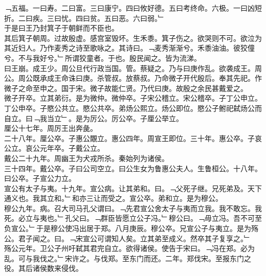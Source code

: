\documentclass{zhvt-classic}
\begin{document}
\hspace*{2em}﹁五福。一曰寿。二曰富。三曰康宁。四曰攸好德。五曰考终命。六极。一曰凶短折。二曰疾。三曰忧。四曰贫。五曰恶。六曰弱。﹂\\
\hspace*{2em}于是曰王乃封箕子于朝鲜而不臣也。\\
\hspace*{2em}其后箕子朝周。过故殷虚。感宫室毁坏。生禾黍。箕子伤之。欲哭则不可。欲泣为其近妇人。乃作麦秀之诗至歌咏之。其诗曰。﹁麦秀渐渐兮。禾黍油油。彼狡僮兮。不与我好兮。﹂所谓狡童者。于也。殷民闻之。皆为流涕。\\
\hspace*{2em}曰王崩。成王少。周公旦代行政当国。管。蔡疑之。乃与曰庚作乱。欲袭成王。周公。周公既承成王命诛曰庚。杀管叔。放蔡叔。乃命微子开代殷后。奉其先祀。作微子之命至申之。国于宋。微子故能仁贤。乃代曰庚。故殷之余民甚戴爱之。\\
\hspace*{2em}微子开卒。立其弟衍。是为微仲。微仲卒。子宋公稽立。宋公稽卒。子丁公申立。丁公申卒。子愍公共立。愍公共卒。弟炀公熙立。炀公即位。愍公子鲋祀弑炀公而自立。曰﹁我当立﹂。是为厉公。厉公卒。子厘公举立。\\
\hspace*{2em}厘公十七年。周厉王出奔彘。\\
\hspace*{2em}二十八年。厘公卒。子惠公覵立。惠公四年。周宣王即位。三十年。惠公卒。子哀公立。哀公元年卒。子戴公立。\\
\hspace*{2em}戴公二十九年。周幽王为犬戎所杀。秦始列为诸侯。\\
\hspace*{2em}三十四年。戴公卒。子曰公司空立。曰公生女为鲁惠公夫人。生鲁桓公。十八年。曰公卒。子宣公力立。\\
\hspace*{2em}宣公有太子与夷。十九年。宣公病。让其弟和。曰。﹁父死子继。兄死弟及。天下通义也。我其立和。﹂和亦三让而受之。宣公卒。弟和立。是为穆公。\\
\hspace*{2em}穆公九年。病。召大司马孔父谓曰。﹁先君宣公舍太子与夷而立我。我不敢忘。我死。必立与夷也。﹂孔父曰。﹁群臣皆愿立公子冯。﹂穆公曰。﹁毋立冯。吾不可至负宣公。﹂于是穆公使冯出居于郑。八月庚辰。穆公卒。兄宣公子与夷立。是为殇公。君子闻之。曰。﹁宋宣公可谓知人矣。立其弟至成义。然卒其子复享之。﹂\\
\hspace*{2em}殇公元年。卫公子州吁弑其君完自立。欲得诸侯。使告于宋曰。﹁冯在郑。必为乱。可与我伐之。﹂宋许之。与伐郑。至东门而还。二年。郑伐宋。至报东门之役。其后诸侯数来侵伐。\\
\end{document}

